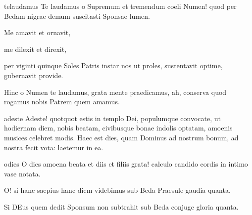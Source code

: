 \documentclass{ees}
\begin{document}
{\begin{movement}{telaudamus}
  \voice[Coro]
  Te laudamus o Supremum
  et tremendum coeli Numen!
  quod per Bedam nigrae demum
  suscitasti Sponsae lumen.

  Me amavit et ornavit,

  \voice[Levita]
  me dilexit et direxit,

  per viginti quinque Soles
  Patris instar nos ut proles,
  sustentavit optime,
  gubernavit provide.

  \voice[Coro]
  Hinc o Numen te laudamus,
  grata mente praedicamus,
  ah, conserva quod rogamus
  nobis Patrem quem amamus.
\end{movement}

\begin{movement}{adeste}
  Adeste!
  quotquot estis in templo Dei,
  populumque convocate,
  ut hodiernam diem, nobis beatam,
  civibusque bonae indolis optatam,
  amoenis musices celebret modis.
  Haec est dies, quam Dominus ad nostrum bonum,
  ad nostra fecit vota: laetemur in ea.
\end{movement}

\begin{movement}{odies}
  \voice[Chorus]
  O dies amoena beata
  et diis et filiis grata!
  calculo candido cordis
  in intimo vase notata.

  O! si hanc saepius
  hanc diem videbimus
  sub Beda Praesule
  gaudia quanta.

  Si DEus quem dedit
  Sponsum non subtrahit
  sub Beda conjuge
  gloria quanta.
\end{movement}
}

\eesScore
\end{document}
